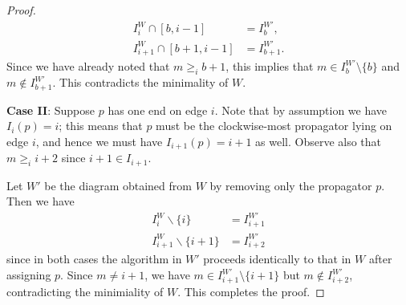\documentclass[11pt]{article}
\theoremstyle{remark}
\theoremstyle{definition}
\begin{document}
\begin{proof}
\begin{align*}
  I_i^{W} \cap [b,i-1] & = I_b^{W'}, \\
  I_{i+1}^{W} \cap [b+1,i-1] & = I_{b+1}^{W'}.
\end{align*} 
Since we have already noted that $m \geq_i b+1$, this implies that $m\in I_b^{W'}\setminus\{b\}$ and $m\not\in I_{b+1}^{W'}$. This contradicts the minimality of $W$.

\textbf{Case II}: Suppose $p$ has one end on edge $i$.  Note that by assumption we have $I_i(p) = i$; this means that $p$ must be the clockwise-most propagator lying on edge $i$, and hence we must have $I_{i+1}(p) = i+1$ as well.  Observe also that $m\geq_i i+2$ since $i+1\in I_{i+1}$.

Let $W'$ be the diagram obtained from $W$ by removing only the propagator $p$.  Then we have
\begin{align*}
  I_i^{W} \backslash \{i\} & = I_{i+1}^{W'} \\
  I_{i+1}^{W} \backslash \{i+1\} & = I_{i+2}^{W'}
\end{align*}
since in both cases the algorithm in $W'$ proceeds identically to that in $W$ after assigning $p$. Since $m \neq i+1$, we have $m\in I_{i+1}^{W'}\setminus\{i+1\}$ but $m\not\in I_{i+2}^{W'}$, contradicting the minimiality of $W$. This completes the proof.
\end{proof}
\end{document}
